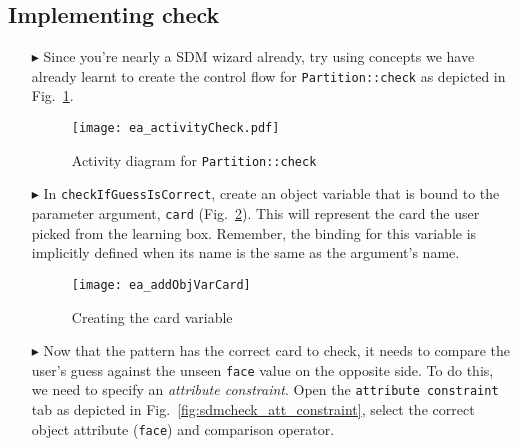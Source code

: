 \newpage
\hypertarget{checkCard vis}{}
\subsection{Implementing check}
\visHeader

\begin{itemize}

\vspace{1cm}

\item[$\blacktriangleright$] Since you're nearly a SDM wizard already, try using concepts we have already learnt to create the control flow for
\texttt{Partition::check} as depicted in Fig.~\ref{fig:sdm_check_start}.

\vspace{1cm}

\begin{figure}[htbp]
\begin{center}
  \texttt{[image: ea\_activityCheck.pdf]}
  \caption{Activity diagram for \texttt{Partition::check}}
  \label{fig:sdm_check_start}
\end{center}
\end{figure}

\vspace{1cm}

\item[$\blacktriangleright$] In \texttt{checkIfGuessIsCorrect}, create an object variable that is bound to the parameter argument, \texttt{card} 
(Fig.~\ref{fig:sdm_check_addCard}). This will represent the card the user picked from the learning box. Remember, the binding for this variable is implicitly
defined when its name is the same as the argument's name.

\begin{figure}[htbp]
\begin{center}
  \texttt{[image: ea\_addObjVarCard]}
  \caption{Creating the card variable}
  \label{fig:sdm_check_addCard}
\end{center}
\end{figure}

\clearpage

\item[$\blacktriangleright$] Now that the pattern has the correct card to check, it needs to compare the user's guess against the unseen \texttt{face} value on
the opposite side. To do this, we need to specify an \emph{attribute constraint}. Open the \texttt{attribute constraint} tab as depicted in
Fig.~\ref{fig:sdmcheck_att_constraint}, select the correct object attribute (\texttt{face}) and comparison operator.


\end{itemize}
